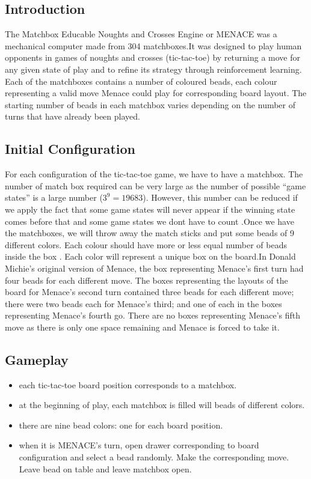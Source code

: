 \documentclass[journal, compsoc]{IEEEtran}
\begin{document}
\subsection{Introduction}
The Matchbox Educable Noughts and Crosses Engine or MENACE was a mechanical computer made from 304 matchboxes.It was designed to play human opponents in games of noughts and crosses (tic-tac-toe) by returning a move for any given state of play and to refine its strategy through reinforcement learning.
Each of the matchboxes contains a number of coloured
beads, each colour representing a valid move Menace could
play for corresponding board layout. The starting number of
beads in each matchbox varies depending on the number of
turns that have already been played.

\subsection{Initial Configuration}
For each configuration of the tic-tac-toe game, we have to
have a matchbox. The number of match box required can be
very large as the number of possible “game states” is a large
number ($3^{9} = 19683$). However, this number can be reduced
if we apply the fact that some game states will never appear
if the winning state comes before that and some game states
we dont have to count .Once we have the matchboxes, we will
throw away the match sticks and put some beads of 9 different
colors. Each colour should have more or less equal number of
beads inside the box . Each color will represent a unique box
on the board.In Donald Michie’s original version of Menace,
the box representing Menace’s first turn had four beads for
each different move. The boxes representing the layouts of the
board for Menace’s second turn contained three beads for each
different move; there were two beads each for Menace’s third;
and one of each in the boxes representing Menace’s fourth go.
There are no boxes representing Menace’s fifth move as there
is only one space remaining and Menace is forced to take it.

\subsection{Gameplay}
\begin{itemize}
\item each tic-tac-toe board position corresponds to a matchbox.
\item at the beginning of play, each matchbox is filled will beads of different colors.
\item there are nine bead colors: one for each board position.
\item when it is MENACE’s turn, open drawer corresponding to board configuration
 and select a bead randomly. Make the corresponding move. Leave bead on
 table and leave matchbox open.

\end{itemize}
\end{document}
